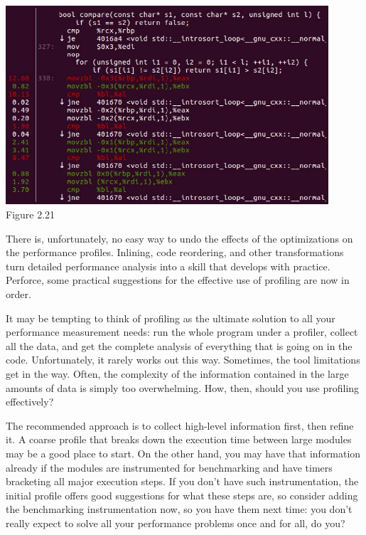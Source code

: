 \hspace*{\fill} \\ %
\begin{center}
\includegraphics[width=0.9\textwidth]{content/1/chapter2/images/21.jpg}\\
Figure 2.21
\end{center}

There is, unfortunately, no easy way to undo the effects of the optimizations on the performance profiles. Inlining, code reordering, and other transformations turn detailed performance analysis into a skill that develops with practice. Perforce, some practical suggestions for the effective use of profiling are now in order.


It may be tempting to think of profiling as the ultimate solution to all your performance measurement needs: run the whole program under a profiler, collect all the data, and get the complete analysis of everything that is going on in the code. Unfortunately, it rarely works out this way. Sometimes, the tool limitations get in the way. Often, the complexity of the information contained in the large amounts of data is simply too overwhelming. How, then, should you use profiling effectively?

The recommended approach is to collect high-level information first, then refine it. A coarse profile that breaks down the execution time between large modules may be a good place to start. On the other hand, you may have that information already if the modules are instrumented for benchmarking and have timers bracketing all major execution steps. If you don't have such instrumentation, the initial profile offers good suggestions for what these steps are, so consider adding the benchmarking instrumentation now, so you have them next time: you don't really expect to solve all your performance problems once and for all, do you?

